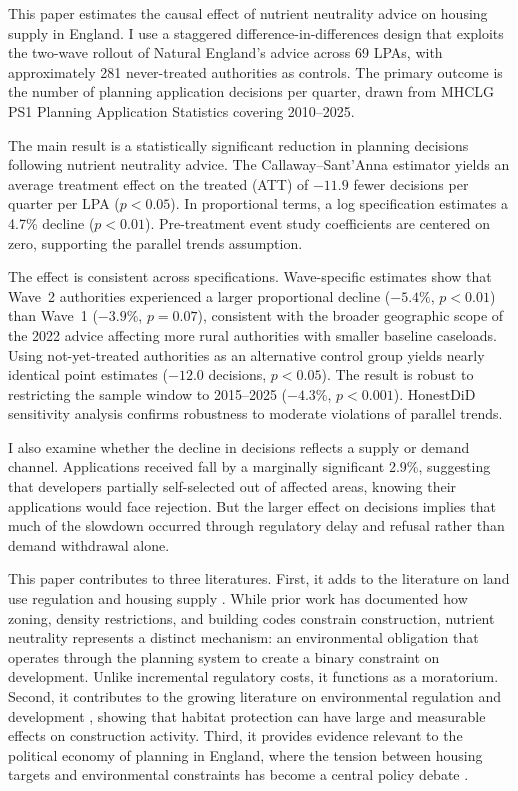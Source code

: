 \documentclass[12pt]{article}
\begin{document}
This paper estimates the causal effect of nutrient neutrality advice on housing supply in England. I use a staggered difference-in-differences design that exploits the two-wave rollout of Natural England's advice across 69 LPAs, with approximately 281 never-treated authorities as controls. The primary outcome is the number of planning application decisions per quarter, drawn from MHCLG PS1 Planning Application Statistics covering 2010--2025.

The main result is a statistically significant reduction in planning decisions following nutrient neutrality advice. The Callaway--Sant'Anna estimator yields an average treatment effect on the treated (ATT) of $-11.9$ fewer decisions per quarter per LPA ($p < 0.05$). In proportional terms, a log specification estimates a 4.7\% decline ($p < 0.01$). Pre-treatment event study coefficients are centered on zero, supporting the parallel trends assumption.

The effect is consistent across specifications. Wave-specific estimates show that Wave~2 authorities experienced a larger proportional decline ($-5.4\%$, $p < 0.01$) than Wave~1 ($-3.9\%$, $p = 0.07$), consistent with the broader geographic scope of the 2022 advice affecting more rural authorities with smaller baseline caseloads. Using not-yet-treated authorities as an alternative control group yields nearly identical point estimates ($-12.0$ decisions, $p < 0.05$). The result is robust to restricting the sample window to 2015--2025 ($-4.3\%$, $p < 0.001$). HonestDiD sensitivity analysis confirms robustness to moderate violations of parallel trends.

I also examine whether the decline in decisions reflects a supply or demand channel. Applications received fall by a marginally significant 2.9\%, suggesting that developers partially self-selected out of affected areas, knowing their applications would face rejection. But the larger effect on decisions implies that much of the slowdown occurred through regulatory delay and refusal rather than demand withdrawal alone.

This paper contributes to three literatures. First, it adds to the literature on land use regulation and housing supply \citep{Glaeser2003, Hilber2016, Turner2014}. While prior work has documented how zoning, density restrictions, and building codes constrain construction, nutrient neutrality represents a distinct mechanism: an environmental obligation that operates through the planning system to create a binary constraint on development. Unlike incremental regulatory costs, it functions as a moratorium. Second, it contributes to the growing literature on environmental regulation and development \citep{Greenstone2002, Henderson1996}, showing that habitat protection can have large and measurable effects on construction activity. Third, it provides evidence relevant to the political economy of planning in England, where the tension between housing targets and environmental constraints has become a central policy debate \citep{Barker2004, Cheshire2018, Hilber2019}.
\end{document}
